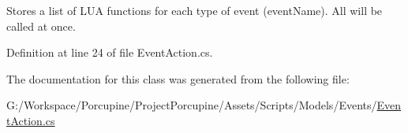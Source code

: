 Stores a list of L\+UA functions for each type of event (event\+Name). All will be called at once. 



Definition at line 24 of file Event\+Action.\+cs.



The documentation for this class was generated from the following file\+:\begin{DoxyCompactItemize}
\item 
G\+:/\+Workspace/\+Porcupine/\+Project\+Porcupine/\+Assets/\+Scripts/\+Models/\+Events/\hyperlink{_event_action_8cs}{Event\+Action.\+cs}\end{DoxyCompactItemize}
